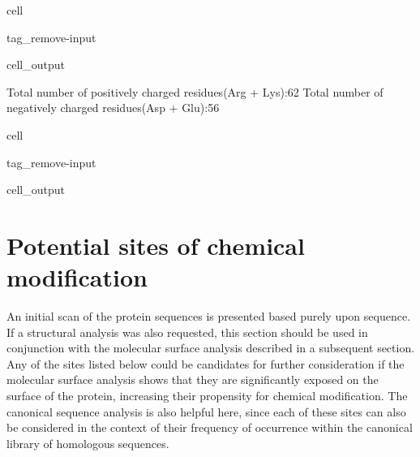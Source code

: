 \documentclass[letterpaper,10pt,english]{jupyterBook}
\begin{document}
\begin{sphinxuseclass}{cell}
\begin{sphinxuseclass}{tag_remove-input}\begin{sphinxVerbatimOutput}

\begin{sphinxuseclass}{cell_output}
\begin{sphinxVerbatim}[commandchars=\\\{\}]
Total number of positively charged residues(Arg + Lys):\PYGZhy{}\PYGZhy{}\PYGZhy{}\PYGZhy{}\PYGZhy{}\PYGZhy{}\PYGZhy{}\PYGZhy{}62
Total number of negatively charged residues(Asp + Glu):\PYGZhy{}\PYGZhy{}\PYGZhy{}\PYGZhy{}\PYGZhy{}\PYGZhy{}\PYGZhy{}\PYGZhy{}56
\end{sphinxVerbatim}

\noindent{}

\end{sphinxuseclass}\end{sphinxVerbatimOutput}

\end{sphinxuseclass}
\end{sphinxuseclass}
\begin{sphinxuseclass}{cell}
\begin{sphinxuseclass}{tag_remove-input}\begin{sphinxVerbatimOutput}

\begin{sphinxuseclass}{cell_output}
\noindent{}

\end{sphinxuseclass}\end{sphinxVerbatimOutput}

\end{sphinxuseclass}
\end{sphinxuseclass}

\section{Potential sites of chemical modification}
\label{\detokenize{ipynb/chapter1:potential-sites-of-chemical-modification}}
\sphinxAtStartPar
An initial scan of the protein sequences is presented based purely upon sequence. If a structural analysis was also requested, this section should be used in conjunction with the molecular surface analysis described in a subsequent section. Any of the sites listed below could be candidates for further consideration if the molecular surface analysis shows that they are significantly exposed on the surface of the protein, increasing their propensity for chemical modification. The canonical sequence analysis is also helpful here, since each of these sites can also be considered in the context of their frequency of occurrence within the canonical library of homologous sequences.
\end{document}
